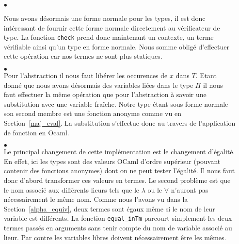 \documentclass {article}
\newcommand{\codefrom}[3]
           {}
\theoremstyle{definition}
\theoremstyle{remark}
\newcommand{\fun}[1]{\lstinline!#1!}
\begin{document}
\begin{itemize}
\item[$\bullet$]

Nous avons désormais une forme normale pour les types, il est donc intéressant de 
fournir cette forme normale directement au vérificateur de type. La fonction \fun{check} prend donc maintenant
un contexte, un terme vérifiable ainsi qu'un type en forme normale. Nous somme obligé d'effectuer cette opération car
nos termes ne sont plus statiques.

  \codefrom{dependent}{lambda}{check_head}

\item[$\bullet$] \\

  Pour l'abstraction il nous faut libérer les occurences de $x$ dans $T$.
  Etant donné que nous avons désormais des variables liées dans le type $\Pi$ il nous faut
  effectuer la même opération que pour l'abstraction à savoir une substitution avec une variable
  fraîche. Notre type étant sous forme normale son second membre est une fonction
  anonyme comme vu en Section~\ref{maj_eval}. La substitution s'effectue donc au travers de l'application de fonction en Ocaml.

  \codefrom{dependent}{lambda}{check_abs}
  
\item[$\bullet$] \\
  
  Le principal changement de cette implémentation est le changement d'égalité. 
  En effet, ici les types sont des valeurs OCaml d'ordre supérieur (pouvant contenir des fonctions anonymes) dont on ne peut 
  tester l'égalité. Il nous faut donc d'abord transformer 
  ces valeurs en termes. Le second problème est que le nom associé 
  aux différents lieurs tels que le $\lambda$ ou le $\forall$ n'auront pas nécessairement le 
  même nom. Comme nous l'avons vu dans la Section~\ref{alpha_equiv},
  deux termes sont égaux même si le nom de leur variable est différents. 
  La fonction \fun{equal_inTm} parcourt simplement les deux termes passés en arguments sans tenir compte
  du nom de variable associé au lieur. Par contre les variables libres doivent nécessairement être les mêmes.

  \codefrom{dependent}{lambda}{check_inv}


\end{itemize}
\end{document}
